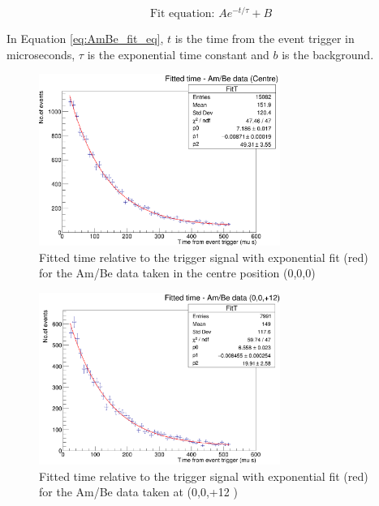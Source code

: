 \begin{equation}
\text{Fit equation: } A e^{-t / \tau}+B
\label{eq:AmBe_fit_eq}
\end{equation}

In Equation \ref{eq:AmBe_fit_eq}, $t$ is the time from the event trigger in microseconds, $\tau$ is the exponential time constant and $b$ is the background. 

\begin{figure}
    \centering
    \includegraphics[width=0.7\textwidth]{Figures/ambe_centre.png}
    \caption{Fitted time relative to the trigger signal with exponential fit (red) for the Am/Be data taken in the centre position (0,0,0)}
    \label{fig:ambe_centre}
\end{figure}

\begin{figure}
    \centering
    \includegraphics[width=0.7\textwidth]{Figures/ambe_data_+12z.png}
    \caption{Fitted time relative to the trigger signal with exponential fit (red) for the Am/Be data taken at (0,0,+12 )}
    \label{fig:ambe_+12z}
\end{figure}

